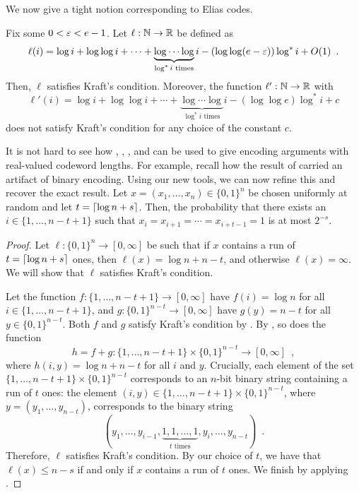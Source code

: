 \documentclass[prodmode,acmcsur]{acmsmall}
\newenvironment{customthm}[1]
  {\renewcommand\theinnercustomthm{#1}\innercustomthm}
  {\endinnercustomthm}
\begin{document}
We now give a tight notion corresponding to Elias codes.
\begin{thm}
  Fix some $0 < \varepsilon < e - 1$. Let $\ell : \mathbb{N} \to \mathbb{R}$ be defined as
  \[
  \ell(i) = \log i + \log \log i + \cdots + \underbrace{\log \cdots
    \log}_{\text{$\log^* i$ times}} i - (\log \log (e - \eps)) \log^*
  i + O(1) \enspace .
  \]
  Then, $\ell$ satisfies Kraft's condition. Moreover, the function
  $\ell' : \mathbb{N} \to \mathbb{R}$ with
  \[
  \ell'(i) = \log i + \log \log i + \cdots + \underbrace{\log \cdots
    \log}_{\text{$\log^* i$ times}} i - (\log \log e) \log^* i + c
  \]
  does not satisfy Kraft's condition for any choice of the constant
  $c$.
\end{thm}

It is not hard to see how , ,
, and  can be used to
give encoding arguments with real-valued codeword lengths. For
example, recall how the result of  carried an artifact
of binary encoding. Using our new tools, we can now refine this and
recover the exact result.
\begin{customthm}{\ref*{thm:runs-i}b}
  Let $x=(x_1,\ldots,x_n)\in\{0,1\}^n$ be chosen uniformly at random
  and let $t = {\lceil \log n + s \rceil}$. Then, the probability that there
  exists an $i\in\{1,\ldots,n-t+1\}$ such that
  $x_i=x_{i+1}=\cdots=x_{i+t-1}=1$ is at most $2^{-s}$.
\end{customthm}
\begin{proof}
  Let $\ell : \{0, 1\}^n \to [0, \infty]$ be such that if $x$ contains
  a run of $t = {\lceil \log n + s \rceil}$ ones, then
  $\ell(x) = \log n + n - t$, and otherwise $\ell(x) = \infty$. We
  will show that $\ell$ satisfies Kraft's condition.


  Let the function $f : \{1, \ldots, n - t + 1\} \to [0, \infty]$ have
  $f(i) = \log n$ for all $i \in \{1, \dots, n - t + 1\}$, and
  $g : \{0, 1\}^{n - t} \to [0, \infty]$ have $g(y) = n - t$ for all
  $y \in \{0, 1\}^{n - t}$. Both $f$ and $g$ satisfy Kraft's condition by
  . By , so does
  the function
  \[
    h = f + g : \{1, \ldots, n - t + 1\} \times \{0, 1\}^{n - t} \to
    [0, \infty] \enspace ,
  \]
  where $h(i, y) = \log n + n - t$ for all $i$ and $y$. Crucially,
  each element of the set $\{1, \ldots, n - t + 1\} \times \{0, 1\}^{n
    - t}$ corresponds to an $n$-bit binary string containing a run of
  $t$ ones: the element $(i, y) \in \{1, \ldots, n - t + 1\} \times
  \{0, 1\}^{n - t}$, where $y = (y_1, \ldots, y_{n - t})$, corresponds
  to the binary string
  \[
  (y_1, \dots, y_{i - 1}, \underbrace{1, 1, \dots, 1}_{\text{$t$ times}},
  y_i, \dots, y_{n - t}) \enspace .
  \]
  Therefore, $\ell$ satisfies Kraft's condition. By our choice of
  $t$, we have that $\ell(x) \leq n - s$ if and only if $x$ contains a
  run of $t$ ones. We finish by applying .
\end{proof}
\end{document}

